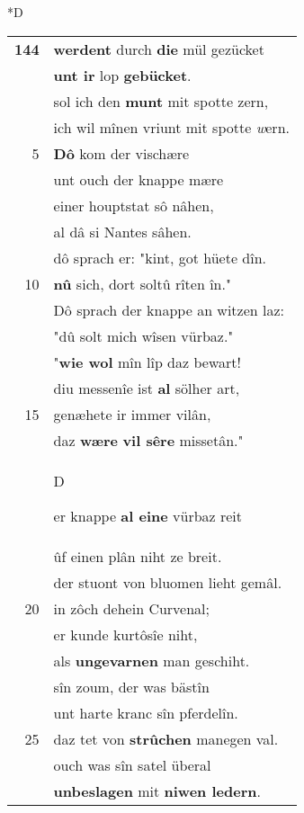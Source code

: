 \documentclass[8pt,a4paper,notitlepage]{article}
\begin{document}
\begin{table}[ht]
\begin{minipage}[t]{0.5\linewidth}
\small
\begin{center}*D
\end{center}
\begin{tabular}{rl}
\textbf{144} & \textbf{werdent} durch \textbf{die} mül gezücket\\ 
 & \textbf{unt ir} lop \textbf{gebücket}.\\ 
 & sol ich den \textbf{munt} mit spotte zern,\\ 
 & ich wil mînen vriunt mit spotte \textit{w}ern.\\ 
5 & \textbf{Dô} kom der vischære\\ 
 & unt ouch der knappe mære\\ 
 & einer houptstat sô nâhen,\\ 
 & al dâ si Nantes sâhen.\\ 
 & dô sprach er: "kint, got hüete dîn.\\ 
10 & \textbf{nû} sich, dort soltû rîten în."\\ 
 & Dô sprach der knappe an witzen laz:\\ 
 & "dû solt mich wîsen vürbaz."\\ 
 & "\textbf{wie wol} mîn lîp daz bewart!\\ 
 & diu messenîe ist \textbf{al} sölher art,\\ 
15 & genæhete ir immer vilân,\\ 
 & daz \textbf{wære} \textbf{vil sêre} missetân."\\ 
 & \begin{large}D\end{large}er knappe \textbf{al eine} vürbaz reit\\ 
 & ûf einen plân niht ze breit.\\ 
 & der stuont von bluomen lieht gemâl.\\ 
20 & in zôch dehein Curvenal;\\ 
 & er kunde kurtôsîe niht,\\ 
 & als \textbf{ungevarnen} man geschiht.\\ 
 & sîn zoum, der was bästîn\\ 
 & unt harte kranc sîn pferdelîn.\\ 
25 & daz tet von \textbf{strûchen} manegen val.\\ 
 & ouch was sîn satel überal\\ 
 & \textbf{unbeslagen} mit \textbf{niwen ledern}.\\ 

\end{tabular}
\end{minipage}
\end{table}
\end{document}
